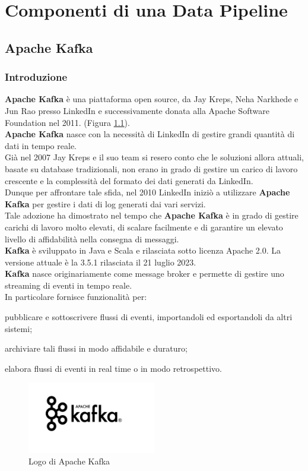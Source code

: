 \chapter{Componenti di una Data Pipeline}\label{cap:Componenti di una Data Pipeline}
\section{Apache Kafka}
\subsection{Introduzione}
\textbf{Apache Kafka} è una piattaforma \gls{open source}{}, da Jay Kreps, Neha Narkhede e Jun Rao presso LinkedIn e successivamente donata alla \gls{Apache Software Foundation}{} nel 2011. (Figura \ref{fig:logo_kafka}).\\
\textbf{Apache Kafka} nasce con la necessità di LinkedIn di gestire grandi quantità di dati in tempo reale.\\ Già nel 2007 
Jay Kreps e il suo team si resero conto che le soluzioni allora attuali, basate su database tradizionali, non erano in grado di gestire 
un carico di lavoro crescente e la complessità del formato dei dati generati da LinkedIn.\\
Dunque per affrontare tale sfida, nel 2010 LinkedIn iniziò a utilizzare \textbf{Apache Kafka} per gestire i dati di log generati dai vari servizi. \\
Tale adozione ha dimostrato nel tempo che \textbf{Apache Kafka} è in grado di gestire carichi di lavoro molto elevati, di scalare facilmente e di garantire un elevato livello di affidabilità nella consegna di messaggi.\\ 
\textbf{Kafka} è sviluppato in Java e Scala e rilasciata sotto licenza Apache 2.0. La versione attuale è la 3.5.1 rilasciata il 21 luglio 2023.\\
\textbf{Kafka} nasce originariamente come \gls{message broker}{} e permette di gestire uno \gls{streaming di eventi}{} in tempo reale. \\ 
In particolare fornisce funzionalità per:
\begin{list}{*}{}
    \item pubblicare e sottoscrivere flussi di eventi, importandoli ed esportandoli da altri sistemi;
    \item archiviare tali flussi in modo affidabile e duraturo;
    \item elabora flussi di eventi in real time o in modo retrospettivo.
\end{list}
\begin{figure}[h]
    \centering
    \includegraphics[width=0.5\textwidth]{images/componenti/logo_kafka.png}
    \caption{Logo di Apache Kafka}
    \label{fig:logo_kafka}
\end{figure}
\pagebreak
